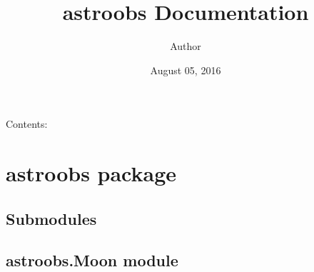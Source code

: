 \documentclass[letterpaper,10pt,english]{sphinxmanual}
\title{astroobs Documentation}
\date{August 05, 2016}
\author{Author}
\begin{document}
\maketitle
\tableofcontents
{}\label{index::doc}


Contents:


\chapter{astroobs package}
\label{astroobs:welcome-to-astroobs-s-documentation}\label{astroobs:astroobs-package}\label{astroobs::doc}

\section{Submodules}
\label{astroobs:submodules}

\section{astroobs.Moon module}
\label{astroobs:module-astroobs.Moon}\label{astroobs:astroobs-moon-module}
\end{document}
